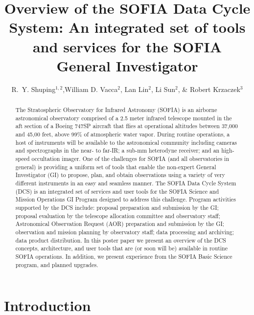 \documentclass[11pt,twoside]{article}
\begin{document}
\title{Overview of the SOFIA Data Cycle System:  An integrated set of tools and services for the SOFIA General Investigator}
\author{R.~Y. Shuping$^{1,2}$,William D. Vacca$^2$, Lan Lin$^2$, Li Sun$^2$, \& Robert Krzaczek$^3$
}

\begin{abstract}
The Stratospheric Observatory for Infrared Astronomy (SOFIA) is an airborne astronomical observatory comprised of a 2.5 meter infrared telescope mounted in the aft section of a Boeing 747SP aircraft that flies at operational altitudes between 37,000 and 45,00 feet, above 99\% of atmospheric water vapor. During routine operations, a host of instruments will be available to the astronomical community including cameras and spectrographs in the near- to far-IR; a sub-mm heterodyne receiver; and an high-speed occultation imager. One of the challenges for SOFIA (and all observatories in general) is providing a uniform set of tools that enable the non-expert General Investigator (GI) to propose, plan, and obtain observations using a variety of very different instruments in an easy and seamless manner. The SOFIA Data Cycle System (DCS) is an integrated set of services and user tools for the SOFIA Science and Mission Operations GI Program designed to address this challenge. Program activities supported by the DCS include:  
proposal preparation and submission by the GI; 
proposal evaluation by the telescope allocation committee and observatory staff;
 Astronomical Observation Request (AOR) preparation and submission by the GI;
 observation and mission planning by observatory staff;
 data processing and archiving;
 data product distribution.
In this poster paper we present an overview of the DCS concepts, architecture, and user tools that are (or soon will be) available in routine SOFIA operations. In addition, we present experience from the SOFIA Basic Science program, and planned upgrades.
\end{abstract}

\section{Introduction}
\end{document}
